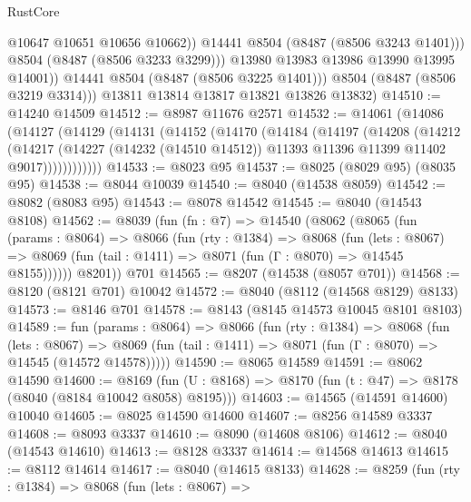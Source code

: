 \begin{lexlean}{RustCore}
\begin{coremodule}
                      @10647
                      @10651
                      @10656
                      @10662))
                  @14441
                  @8504
                  (@8487 (@8506 @3243 @1401)))
                @8504
                (@8487 (@8506 @3233 @3299)))
              @13980
              @13983
              @13986
              @13990
              @13995
              @14001))
          @14441
          @8504
          (@8487 (@8506 @3225 @1401)))
        @8504
        (@8487 (@8506 @3219 @3314)))
      @13811
      @13814
      @13817
      @13821
      @13826
      @13832)
@14510 := @14240 @14509
@14512 := @8987 @11676 @2571
@14532 := @14061
    (@14086
      (@14127
        (@14129
          (@14131
            (@14152
              (@14170
                (@14184
                  (@14197
                    (@14208
                      (@14212
                        (@14217
                          (@14227
                            (@14232 (@14510 @14512))
                            @11393
                            @11396
                            @11399
                            @11402
                            @9017))))))))))))
@14533 := @8023 @95
@14537 := @8025 (@8029 @95) (@8035 @95)
@14538 := @8044 @10039
@14540 := @8040 (@14538 @8059)
@14542 := @8082 (@8083 @95)
@14543 := @8078 @14542
@14545 := @8040 (@14543 @8108)
@14562 := @8039
    (fun (fn : @7) =>
    @14540
      (@8062
        (@8065
          (fun (params : @8064) =>
          @8066
            (fun (rty : @1384) =>
            @8068
              (fun (lets : @8067) =>
              @8069 (fun (tail : @1411) => @8071 (fun (Γ : @8070) => @14545 @8155))))))
        @8201))
    @701
@14565 := @8207 (@14538 (@8057 @701))
@14568 := @8120 (@8121 @701) @10042
@14572 := @8040 (@8112 (@14568 @8129) @8133)
@14573 := @8146 @701
@14578 := @8143 (@8145 @14573 @10045 @8101 @8103)
@14589 := fun (params : @8064) =>
  @8066
    (fun (rty : @1384) =>
    @8068
      (fun (lets : @8067) =>
      @8069 (fun (tail : @1411) => @8071 (fun (Γ : @8070) => @14545 (@14572 @14578)))))
@14590 := @8065 @14589
@14591 := @8062 @14590
@14600 := @8169
    (fun (U : @8168) => @8170 (fun (t : @47) => @8178 (@8040 (@8184 @10042 @8058) @8195)))
@14603 := @14565 (@14591 @14600) @10040
@14605 := @8025 @14590 @14600
@14607 := @8256 @14589 @3337
@14608 := @8093 @3337
@14610 := @8090 (@14608 @8106)
@14612 := @8040 (@14543 @14610)
@14613 := @8128 @3337
@14614 := @14568 @14613
@14615 := @8112 @14614
@14617 := @8040 (@14615 @8133)
@14628 := @8259
    (fun (rty : @1384) =>
    @8068
      (fun (lets : @8067) =>

\end{coremodule}
\end{lexlean}
